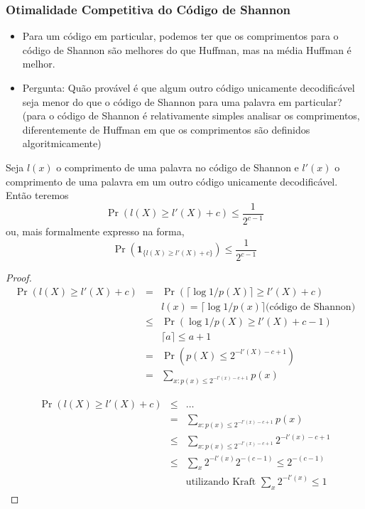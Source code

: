 \begin{frame}[allowframebreaks]
  \frametitle{Otimalidade Competitiva do Código de Shannon}
  \begin{itemize}
  \item Para um código em particular, podemos ter que os comprimentos para o código de Shannon são melhores do que Huffman, mas na média Huffman é melhor.
  \item Pergunta: Quão provável é que algum outro código unicamente decodificável seja menor do que o código de Shannon para uma palavra em particular?
	(para o código de Shannon é relativamente simples analisar os comprimentos, diferentemente de Huffman em que os comprimentos são definidos algoritmicamente)
  \end{itemize}
  
  \framebreak
  \begin{theorem}
  Seja $l(x)$ o comprimento de uma palavra no código de Shannon e $l'(x)$ o comprimento de uma palavra em um outro código unicamente decodificável. Então teremos
	\begin{equation}
	\Pr \left( l(X) \geq l'(X) + c \right) \leq \frac{1}{2^{c-1}}
	\end{equation}
  ou, mais formalmente expresso na forma,
	\begin{equation}
        \Pr \left( \mathbf{1}_{ \{ l(X) \geq l'(X) + c\} } \right) \leq \frac{1}{2^{c-1}}
        \end{equation}
  \end{theorem}

  \framebreak

  \begin{proof}
  \begin{eqnarray}
  \Pr \left( l(X) \geq l'(X) + c \right) &=& \Pr \left( \lceil \log 1/p(X) \rceil \geq l'(X) + c \right) \nonumber \\
						&& l(x) = \lceil \log 1/p(x) \rceil \text{(código de Shannon)}  \nonumber \\
					&\leq& \Pr \left( \log 1/p(X) \geq l'(X) + c - 1  \right) \nonumber \\
						&& \lceil a \rceil \leq a + 1 \nonumber \\
					&=& \Pr \left( p(X) \leq 2^{-l'(X)-c+1} \right) \nonumber \\
                                        &=& \sum_{x:p(x) \leq 2^{-l'(x)-c+1}} p(x) 
  \end{eqnarray}

  \proofbreak

  \vspace{-0.75cm} 
  \begin{eqnarray}
  \Pr \left( l(X) \geq l'(X) + c \right) &\leq& \ldots \nonumber \\
					&=& \sum_{x:p(x) \leq 2^{-l'(x)-c+1}} p(x) \nonumber \\
					&\leq& \sum_{x:p(x) \leq 2^{-l'(x)-c+1}}  2^{-l'(x)-c+1} \nonumber \\
					&\leq& \sum_{x} 2^{-l'(x)} 2^{-(c-1)} \leq 2^{-(c-1)} \\
						&& \text{utilizando Kraft } \sum_{x} 2^{-l'(x)} \leq 1 \nonumber
  \end{eqnarray}
  \end{proof}


\end{frame}
